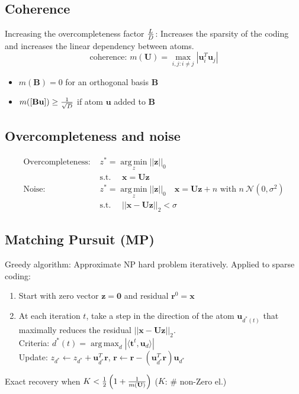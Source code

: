 \documentclass[a4paper,11pt,landscape]{article}
\newcommand{\argmax}{\operatorname*{arg\,max}}
\newcommand{\argmin}{\operatorname*{arg\,min}}
\newcommand{\normal}{\mathcal N}
\begin{document}
\begin{multicols}{3}
\subsection{Coherence}
Increasing the overcompleteness factor ${L \over D}$: Increases the sparsity of the coding and increases the linear dependency between atoms.
\[
 \text{coherence: } m(\mathbf U) = \max_{i, j: i \neq j} \left| \mathbf u_i^T \mathbf u_j \right|
\]
\begin{itemize}
 \item $m(\mathbf B) = 0$ for an orthogonal basis $\mathbf B$
 \item $m([\mathbf B \mathbf u]) \geq {1 \over \sqrt{D}}$ if atom $\mathbf u$ added to $\mathbf B$
\end{itemize}
\subsection{Overcompleteness and noise}
\begin{align*}
 \text{Overcompleteness: }& z^* = \argmin_z ||\mathbf z||_0 \\
 &\text{s.t. }\quad \mathbf x = \mathbf U \mathbf z\\
 \text{Noise: }& z^* = \argmin_z ||\mathbf z||_0 \quad \mathbf x = \mathbf U \mathbf z + n  \text{ with }n ~ \normal(0, \sigma^2)\\
 &\text{s.t. }\quad ||\mathbf x - \mathbf U \mathbf z||_2 < \sigma
\end{align*}
\subsection{Matching Pursuit (MP)}
Greedy algorithm: Approximate NP hard problem iteratively. Applied to sparse coding:
\begin{enumerate}
 \item Start with zero vector $\mathbf z = \mathbf 0$ and residual $\mathbf r^0 = \mathbf x$
 \item At each iteration $t$, take a step in the direction of the atom $\mathbf u_{d^*(t)}$ that maximally reduces the residual $||\mathbf x - \mathbf U \mathbf z||_2$.\\
 Criteria: $d^*(t) = \argmax_d |\langle \mathbf t^t, \mathbf u_d \rangle |$\\
 Update: $z_{d^*} \leftarrow z_{d^*} + \mathbf u_{d^*}^T \mathbf r$, $\mathbf r \leftarrow \mathbf r - (\mathbf u_{d^*}^T \mathbf r) \mathbf u_{d^*}$
\end{enumerate}
Exact recovery when $K < {1 \over 2} \left( 1 + {1 \over m(\mathbf U)} \right)$ ($K$: \# non-Zero el.)

\end{multicols}
\end{document}
